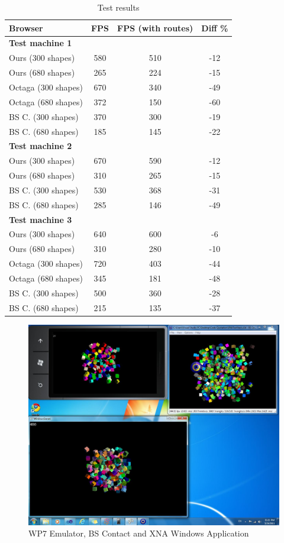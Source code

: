 \begin{table}[htb]\small
\centering
\begin{tabular}{|l|c|c|c|}
\hline
Browser & FPS & FPS (with routes) & Diff \% 	 \\
\hline
\textbf{Test machine 1}  & & & \\
\hline
Ours (300 shapes) & 580 & 510 & -12 \\
Ours (680 shapes) & 265 & 224 & -15 \\
Octaga (300 shapes) &  670 & 340 & -49 \\
Octaga (680 shapes) &  372 & 150 & -60 \\
BS C. (300 shapes) & 370 & 300 & -19 \\
BS C. (680 shapes) & 185 & 145 & -22 \\
\hline
\textbf{Test machine 2}  & & & \\
\hline
Ours (300 shapes) & 670 & 590 & -12 \\
Ours (680 shapes) & 310 & 265 & -15 \\
BS C. (300 shapes) & 530 & 368 & -31 \\
BS C. (680 shapes) & 285 & 146 & -49 \\
\hline
\textbf{Test machine 3}  & & & \\
\hline
Ours (300 shapes) & 640 & 600 & -6 \\
Ours (680 shapes) & 310 & 280 & -10 \\
Octaga (300 shapes) &  720 & 403 & -44 \\
Octaga (680 shapes) &  345 & 181 & -48 \\
BS C. (300 shapes) & 500 & 360 & -28 \\
BS C. (680 shapes) & 215 & 135 & -37 \\
\hline
\end{tabular}
\caption{Test results}
\end{table}

\begin{figure}
\begin{center}
\includegraphics[scale=0.2]{browsers.jpg}
\end{center}
\caption{WP7 Emulator, BS Contact and XNA Windows Application}
\end{figure}

